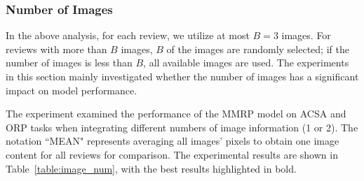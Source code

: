 \documentclass[preprint,12pt]{elsarticle}
\begin{document}
\subsubsection{Number of Images}





In the above analysis, for each review, we utilize at most $B=3$ images. For reviews with more than $B$ images, $B$ of the images are randomly selected; if the number of images is less than $B$, all available images are used. The experiments in this section mainly investigated whether the number of images has a significant impact on model performance. 

The experiment examined the performance of the MMRP model on ACSA and ORP tasks when integrating different numbers of image information (1 or 2). The notation ``MEAN" represents averaging all images' pixels to obtain one image content for all reviews for comparison. The experimental results are shown in Table~\ref{table:image_num}, with the best results highlighted in bold.
\end{document}
